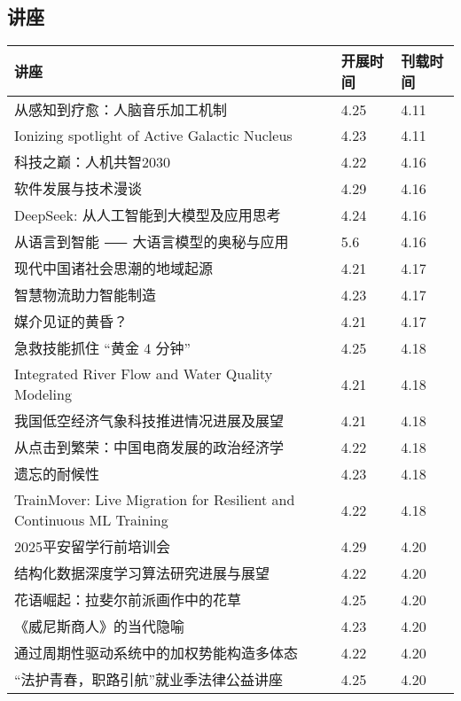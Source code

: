 \documentclass[letterpaper, 12pt]{article}
\begin{document}
\begin{multicols}{2}
\pagebreak

\section{讲座}
\begin{tabular}{|>{\centering\arraybackslash}m{}|m{}|m{}|}
    \hline
    讲座 & 开展时间 & 刊载时间\\
    \hline\hline
    从感知到疗愈：人脑音乐加工机制 & 4.25 & 4.11\\\hline
    Ionizing spotlight of Active Galactic Nucleus & 4.23 & 4.11\\\hline
    科技之巅：人机共智2030 & 4.22 & 4.16\\\hline
    软件发展与技术漫谈 & 4.29 & 4.16\\\hline
    DeepSeek: 从人工智能到大模型及应用思考 & 4.24 & 4.16\\\hline
    从语言到智能 ⸺ 大语言模型的奥秘与应用 & 5.6 & 4.16\\\hline
    现代中国诸社会思潮的地域起源 & 4.21 & 4.17\\\hline
    智慧物流助力智能制造 & 4.23 & 4.17\\\hline
    媒介见证的黄昏？ & 4.21 & 4.17\\\hline
    急救技能抓住 “黄金 4 分钟” & 4.25 & 4.18\\\hline
    Integrated River Flow and Water Quality Modeling & 4.21 & 4.18\\\hline
    我国低空经济气象科技推进情况进展及展望 & 4.21 & 4.18\\\hline
    从点击到繁荣：中国电商发展的政治经济学 & 4.22 & 4.18\\\hline
    遗忘的耐候性 & 4.23 & 4.18\\\hline
    TrainMover: Live Migration for Resilient and Continuous ML Training & 4.22 & 4.18\\\hline
    2025平安留学行前培训会 & 4.29 & 4.20\\\hline
    结构化数据深度学习算法研究进展与展望 & 4.22 & 4.20\\\hline
    花语崛起：拉斐尔前派画作中的花草 & 4.25 & 4.20\\\hline
    《威尼斯商人》的当代隐喻 & 4.23 & 4.20\\\hline
    通过周期性驱动系统中的加权势能构造多体态 & 4.22 & 4.20\\\hline
    “法护青春，职路引航”就业季法律公益讲座 & 4.25 & 4.20\\\hline
    

\end{tabular}
\end{multicols}
\end{document}
